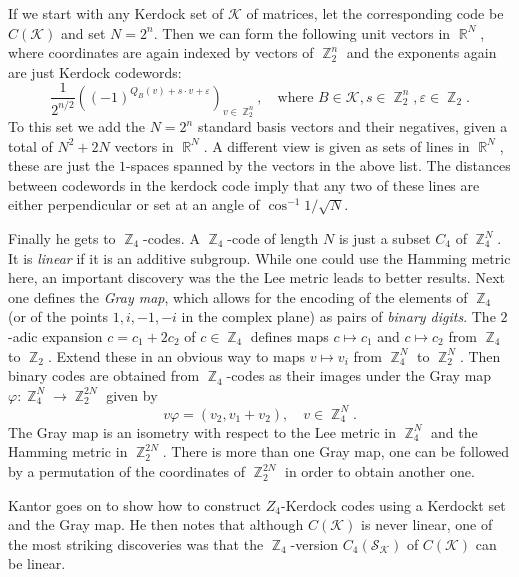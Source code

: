 \documentclass[a4paper]{article}
\DeclareMathOperator{\R}{\mathbb{R}}
\DeclareMathOperator{\Z}{\mathbb{Z}}
\begin{document}
  If we start with any Kerdock set of $\mathcal K$ of
  matrices, let the corresponding code be  $C(\mathcal K)$ 
  and set $N = 2^{n}$. Then we can form the following unit
  vectors in $\R^{N}$, where coordinates are again indexed
  by vectors of $\Z_2^{n}$ and the exponents again are just
  Kerdock codewords:
  \begin{equation}
    \frac{1}{2^{n / 2}} 
    \left(
      (-1)^{Q_B(v)+s \cdot v + \varepsilon}
    \right)_{v \in \Z_2^{n}},
    \quad
    \text{where }
    B \in \mathcal K, s \in \Z_2^{n}, \varepsilon \in \Z_2.
  \end{equation}
  To this set we add the $N = 2^{n}$ standard basis vectors
  and their negatives, given a total of $N^2+2N$ vectors in
  $\R^{N}$. A different view is given as sets of lines in
  $\R^{N}$, these are just the $1$-spaces spanned by the
  vectors in the above list. The distances between codewords
  in the kerdock code imply that any two of these lines are
  either perpendicular or set at an angle of $\cos^{-1} 1 /
  \sqrt{N}$.

  Finally he gets to $\Z_4$-codes. A $\Z_4$-code of length
  $N$ is just a subset $C_4$ of $\Z_4^{N}$. It is
  \textit{linear} if it is an additive subgroup. While one
  could use the Hamming metric here, an important discovery
  was the the Lee metric leads to better results. Next one
  defines the \textit{Gray map}, which allows for the
  encoding of the elements of $\Z_4$ (or of the points $1,
  i, -1, -i$ in the complex plane) as pairs of
  \textit{binary digits}. The $2$-adic expansion $c = c_1 +
  2c_2$ of $c \in \Z_4$ defines maps $c \mapsto c_1$ and $c
  \mapsto c_2$ from $\Z_4$ to $\Z_2$. Extend these in an
  obvious way to maps $v \mapsto v_i$ from $\Z_4^{N}$ to
  $\Z_2^{N}$. Then binary codes are obtained from
  $\Z_4$-codes as their images under the Gray map $\varphi :
  \Z_4^{N} \to \Z_2^{2N}$ given by
  \[
    v \varphi = (v_2, v_1+v_2),
    \quad v \in \Z_4^{N}.
  \] 
  The Gray map is an isometry with respect to the Lee metric
  in $\Z_4^{N}$ and the Hamming metric in $\Z_2^{2N}$. There
  is more than one Gray map, one can be followed by a
  permutation of the coordinates of $\Z_2^{2N}$ in order to
  obtain another one.

  Kantor goes on to show how to construct $Z_4$-Kerdock
  codes using a Kerdockt set and the Gray map. He then notes
  that although $C(\mathcal K)$ is never linear, one of the
  most striking discoveries was that the $\Z_4$-version
  $C_4(\mathcal S_{\mathcal K})$ of $C(\mathcal K)$ can be
  linear. 
\end{document}
